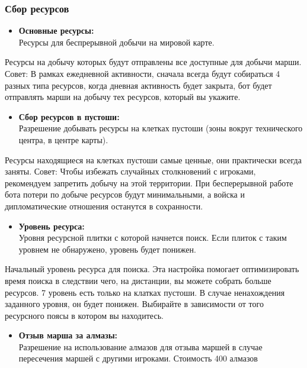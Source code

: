 \documentclass[
]{article}
\providecommand{\tightlist}{%
  \setlength{\itemsep}{0pt}\setlength{\parskip}{0pt}}
\begin{document}
\subsubsection{Сбор
ресурсов}\label{ux441ux431ux43eux440-ux440ux435ux441ux443ux440ux441ux43eux432}

\begin{itemize}
\tightlist
\item
  \textbf{Основные ресурсы:}\\
  Ресурсы для беспрерывной добычи на мировой карте.
\end{itemize}

Ресурсы на добычу которых будут отправлены все доступные для добычи
марши. Совет: В рамках ежедневной активности, сначала всегда будут
собираться 4 разных типа ресурсов, когда дневная активность будет
закрыта, бот будет отправлять марши на добычу тех ресурсов, который вы
укажите.

\begin{itemize}
\tightlist
\item
  \textbf{Сбор ресурсов в пустоши:}\\
  Разрешение добывать ресурсы на клетках пустоши (зоны вокруг
  технического центра, в центре карты).
\end{itemize}

Ресурсы находящиеся на клетках пустоши самые ценные, они практически
всегда заняты. Совет: Чтобы избежать случайных столкновений с игроками,
рекомендуем запретить добычу на этой территории. При бесперерывной
работе бота потери по добыче ресурсов будут минимальными, а войска и
дипломатические отношения останутся в сохранности.

\begin{itemize}
\tightlist
\item
  \textbf{Уровень ресурса:}\\
  Уровня ресурсной плитки с которой начнется поиск. Если плиток с таким
  уровнем не обнаружено, уровень будет понижен.
\end{itemize}

Начальный уровень ресурса для поиска. Эта настройка помогает
оптимизировать время поиска в следствии чего, на дистанции, вы можете
собрать больше ресурсов. 7 уровень есть только на клатках пустоши. В
случае ненахождения заданного уровня, он будет понижен. Выбирайте в
зависимости от того ресурсного поясы в котором вы находитесь.

\begin{itemize}
\tightlist
\item
  \textbf{Отзыв марша за алмазы:}\\
  Разрешение на использование алмазов для отзыва маршей в случае
  пересечения маршей с другими игроками. Стоимость 400 алмазов
\end{itemize}
\end{document}

